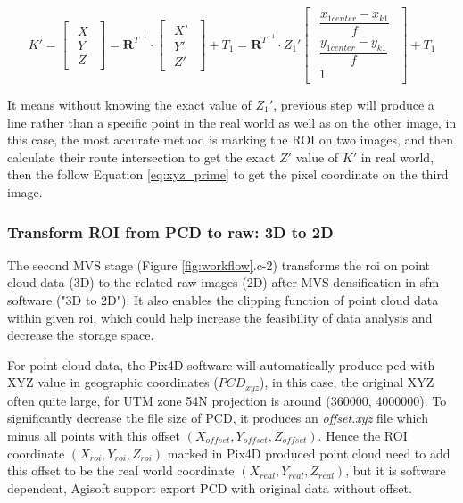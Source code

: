 \documentclass{configs/bmcart}
\begin{document}
$$
  K' = 
  \begin{bmatrix}
    \begin{matrix}
      X \\ Y \\ Z
    \end{matrix}
  \end{bmatrix} 
  = 
  \mathbf{R}^{T^{-1}} \cdot 
  \begin{bmatrix}
    \begin{matrix}
      X' \\ Y' \\ Z'
    \end{matrix}
  \end{bmatrix} + T_1
  =
  \mathbf{R}^{T^{-1}} \cdot Z_1'
  \begin{bmatrix}
    \begin{matrix}
      \dfrac{x_{1center} - x_{k1}}{f} \\ \dfrac{y_{1center} - y_{k1}}{f} \\ 1
    \end{matrix}
  \end{bmatrix} + T_1
$$

It means without knowing the exact value of $Z_1'$, previous step will produce a line rather than a specific point in the real world as well as on the other image, in this case, the most accurate method is marking the ROI on two images, and then calculate their route intersection to get the exact $Z'$ value of $K'$ in real world, then the follow Equation \ref{eq:xyz_prime} to get the pixel coordinate on the third image. 

\subsubsection*{Transform ROI from PCD to raw: 3D to 2D}
The second MVS stage (Figure \ref{fig:workflow}.c-2) transforms the \acrfull*{roi} on point cloud data (3D) to the related raw images (2D) after MVS densification in \acrlong*{sfm} software ("3D to 2D"). It also enables the clipping function of point cloud data within given \acrshort*{roi}, which could help increase the feasibility of data analysis and decrease the storage space.

For point cloud data, the Pix4D software will automatically produce \acrfull*{pcd} with XYZ value in geographic coordinates ($PCD_{xyz}$), in this case, the original XYZ often quite large, for UTM zone 54N projection is around (360000, 4000000). To significantly decrease the file size of PCD, it produces an \textit{offset.xyz} file which minus all points with this offset $(X_{offset}, Y_{offset}, Z_{offset})$. Hence the ROI coordinate $(X_{roi}, Y_{roi}, Z_{roi})$ marked in Pix4D produced point cloud need to add this offset to be the real world coordinate $(X_{real}, Y_{real}, Z_{real})$, but it is software dependent, Agisoft support export PCD with original data without offset.
\end{document}
